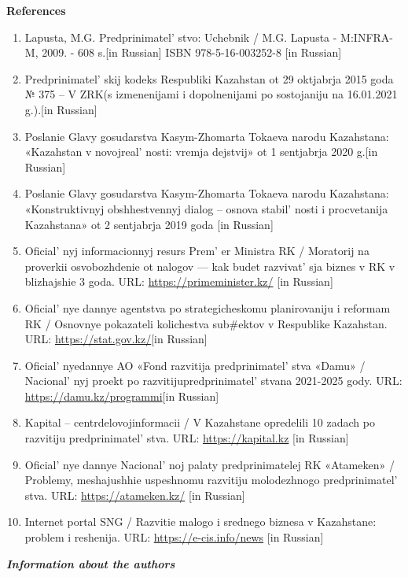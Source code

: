{\bfseries References}

\begin{enumerate}
\def\labelenumi{\arabic{enumi}.}
\item
  Lapusta, M.G. Predprinimatel' stvo: Uchebnik / M.G.
  Lapusta - M:INFRA-M, 2009. - 608 s.{[}in Russian{]} ISBN
  978-5-16-003252-8 {[}in Russian{]}
\item
  Predprinimatel' skij kodeks Respubliki Kazahstan ot 29
  oktjabrja 2015 goda № 375 -- V ZRK(s izmenenijami i dopolnenijami po
  sostojaniju na 16.01.2021 g.).{[}in Russian{]}
\item
  Poslanie Glavy gosudarstva Kasym-Zhomarta Tokaeva narodu Kazahstana:
  «Kazahstan v novojreal' nosti: vremja dejstvij» ot 1
  sentjabrja 2020 g.{[}in Russian{]}
\item
  Poslanie Glavy gosudarstva Kasym-Zhomarta Tokaeva narodu Kazahstana:
  «Konstruktivnyj obshhestvennyj dialog -- osnova
  stabil' nosti i procvetanija Kazahstana» ot 2
  sentjabrja 2019 goda {[}in Russian{]}
\item
  Oficial' nyj informacionnyj resurs
  Prem' er Ministra RK / Moratorij na proverkii
  osvobozhdenie ot nalogov --- kak budet razvivat' sja
  biznes v RK v blizhajshie 3 goda. URL: \url{https://primeminister.kz/}
  {[}in Russian{]}
\item
  Oficial' nye dannye agentstva po strategicheskomu
  planirovaniju i reformam RK / Osnovnye pokazateli kolichestva
  sub\#ektov v Respublike Kazahstan. URL:
  \url{https://stat.gov.kz/}{[}in Russian{]}
\item
  Oficial' nyedannye AO «Fond razvitija
  predprinimatel' stva «Damu» /
  Nacional' nyj proekt po
  razvitijupredprinimatel' stvana 2021-2025 gody. URL:
  \url{https://damu.kz/programmi}{[}in Russian{]}
\item
  Kapital -- centrdelovojinformacii / V Kazahstane opredelili 10 zadach
  po razvitiju predprinimatel' stva. URL:
  \url{https://kapital.kz} {[}in Russian{]}
\item
  Oficial' nye dannye Nacional' noj palaty
  predprinimatelej RK «Atameken» / Problemy, meshajushhie uspeshnomu
  razvitiju molodezhnogo predprinimatel' stva. URL:
  \url{https://atameken.kz/} {[}in Russian{]}
\item
  Internet portal SNG / Razvitie malogo i srednego biznesa v Kazahstane:
  problem i reshenija. URL: \url{https://e-cis.info/news} {[}in
  Russian{]}
\end{enumerate}

\emph{{\bfseries Information about the authors}}


